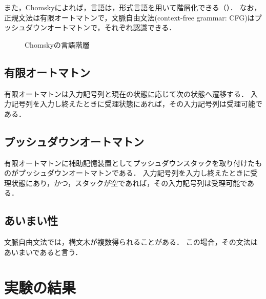 \documentclass[uplatex, dvipdfmx, a4paper, twocolumn]{jsarticle}
\begin{document}
  また，Chomskyによれば，言語は，形式言語を用いて階層化できる（）．
  なお，正規文法は有限オートマトンで，文脈自由文法(context-free grammar: CFG)はプッシュダウンオートマトンで，それぞれ認識できる．
  \begin{figure}[htpb]
    \centering
    \caption{Chomskyの言語階層\cite{jikken3c1}}
    \label{fig:chomsky}
  \end{figure}

    \subsection{有限オートマトン}
    有限オートマトンは入力記号列と現在の状態に応じて次の状態へ遷移する．
    入力記号列を入力し終えたときに受理状態にあれば，その入力記号列は受理可能である．

    \subsection{プッシュダウンオートマトン}
    有限オートマトンに補助記憶装置としてプッシュダウンスタックを取り付けたものがプッシュダウンオートマトンである．
    入力記号列を入力し終えたときに受理状態にあり，かつ，スタックが空であれば，その入力記号列は受理可能である．

    \subsection{あいまい性}
    文脈自由文法では，構文木が複数得られることがある．
    この場合，その文法はあいまいであると言う．

  \section{実験の結果}\label{kekka}
\end{document}
